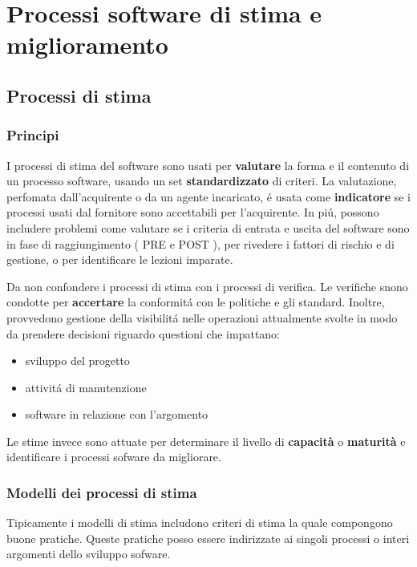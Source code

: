 \chapter{Processi software di stima e miglioramento}
\section{Processi di stima}
\subsection{Principi}
I processi di stima del software sono usati per \textbf{valutare} la forma e il contenuto di un processo software, usando un set \textbf{standardizzato} di criteri. \newline
La valutazione, perfomata dall'acquirente o da un agente incaricato, \'e usata come \textbf{indicatore} se i processi usati dal fornitore sono accettabili per l'acquirente.\newline
In pi\'u, possono includere problemi come valutare se i criteria di entrata e uscita del software sono in fase di raggiungimento ( PRE e POST ), per rivedere i fattori di rischio e di gestione, o per identificare le lezioni imparate.\newline

Da non confondere i processi di stima con i processi di verifica. Le verifiche snono condotte per \textbf{accertare} la conformit\'a con le politiche e gli standard. Inoltre, provvedono gestione della visibilit\'a nelle operazioni attualmente svolte in modo da prendere decisioni riguardo questioni che impattano:
\begin{itemize}
\item sviluppo del progetto
\item attivit\'a di manutenzione
\item software in relazione con l'argomento
\end{itemize}
Le stime invece sono attuate per determinare il livello di \textbf{capacit\`a} o \textbf{maturit\`a} e identificare i processi sofware da migliorare.

\subsection{Modelli dei processi di stima}
Tipicamente i modelli di stima includono criteri di stima la quale compongono buone pratiche. \newline
Queste pratiche posso essere indirizzate ai singoli processi o interi argomenti dello sviluppo sofware.

